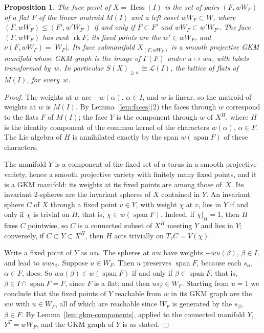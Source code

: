 \documentclass[11pt,a4paper]{article}
\numberwithin{equation}{section}
\theoremstyle{plain}
\newtheorem{proposition}[theorem]{Proposition}
\theoremstyle{definition}
\theoremstyle{remark}
\newcommand{\cL}{\mathcal{L}}
\DeclareMathOperator{\Hess}{Hess}
\DeclareMathOperator{\rk}{rk}
\DeclareMathOperator{\spn}{span}
\begin{document}
\begin{proposition}\label{prop:lie-faces}
The face poset of $X=\Hess(I)$ is the set of pairs $(F,wW_F)$ of a flat $F$ of the linear matroid $M(I)$ and a left coset $wW_F\subset W$, where $(F,wW_F)\leqslant(F',w'W_{F'})$ if and only if $F\subset F'$ and $wW_F\subset w'W_{F'}$. The face $(F,wW_F)$ has rank $\rk F$, its fixed points are the $w'\in wW_F$, and $\nu(F,wW_F)=|W_F|$. Its face submanifold $X_{(F,wW_F)}$ is a smooth projective GKM manifold whose GKM graph is the image of $\Gamma(F)$ under $u\mapsto wu$, with labels transformed by~$w$. In particular $S(X)_{\geqslant w}\cong\cL(I)$, the lattice of flats of $M(I)$, for every~$w$.
\end{proposition}

\begin{proof}
The weights at $w$ are $-w(\alpha)$, $\alpha\in I$, and $w$ is linear, so the matroid of weights at $w$ is $M(I)$. By Lemma~\ref{lem:faces}(2) the faces through $w$ correspond to the flats $F$ of $M(I)$; the face $Y$ is the component through $w$ of $X^H$, where $H$ is the identity component of the common kernel of the characters $w(\alpha)$, $\alpha\in F$. The Lie algebra of $H$ is annihilated exactly by the span $w(\spn F)$ of these characters.

The manifold $Y$ is a component of the fixed set of a torus in a smooth projective variety, hence a smooth projective variety with finitely many fixed points, and it is a GKM manifold: its weights at its fixed points are among those of~$X$. Its invariant $2$-spheres are the invariant spheres of $X$ contained in $Y$. An invariant sphere $C$ of $X$ through a fixed point $v\in Y$, with weight $\chi$ at $v$, lies in $Y$ if and only if $\chi$ is trivial on $H$, that is, $\chi\in w(\spn F)$. Indeed, if $\chi|_H=1$, then $H$ fixes $C$ pointwise, so $C$ is a connected subset of $X^H$ meeting $Y$ and lies in $Y$; conversely, if $C\subset Y\subset X^H$, then $H$ acts trivially on $T_vC=V(\chi)$.

Write a fixed point of $Y$ as $wu$. The spheres at $wu$ have weights $-wu(\beta)$, $\beta\in I$, and lead to $wus_\beta$. Suppose $u\in W_F$. Then $u$ preserves $\spn F$, because each $s_\alpha$, $\alpha\in F$, does. So $wu(\beta)\in w(\spn F)$ if and only if $\beta\in\spn F$, that is, $\beta\in I\cap\spn F=F$, since $F$ is a flat; and then $us_\beta\in W_F$. Starting from $u=1$ we conclude that the fixed points of $Y$ reachable from $w$ in its GKM graph are the $wu$ with $u\in W_F$, all of which are reachable since $W_F$ is generated by the $s_\beta$, $\beta\in F$. By Lemma~\ref{lem:gkm-components}, applied to the connected manifold $Y$, $Y^T=wW_F$, and the GKM graph of $Y$ is as stated.


\end{proof}
\end{document}
